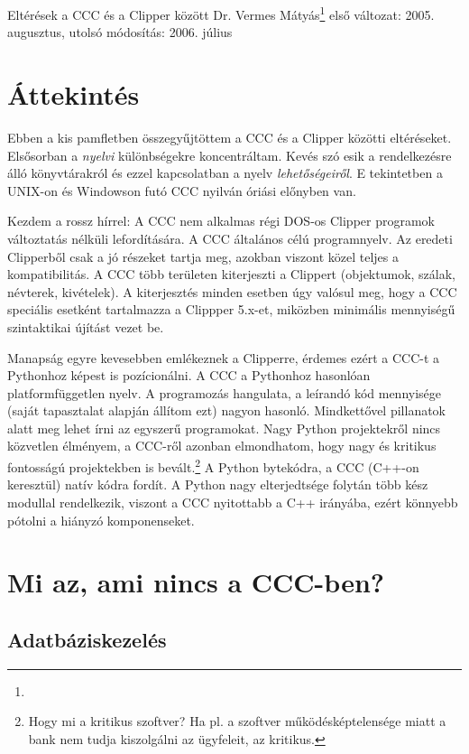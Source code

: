 
\pagetitle%
{Eltérések a CCC és a Clipper  között}%
{Dr. Vermes Mátyás\footnote{\ComFirm}}%
{első változat: 2005. augusztus, utolsó módosítás: 2006. július}

\section{Áttekintés}

Ebben a kis pamfletben összegyűjtöttem a CCC és a Clipper közötti 
eltéréseket. Elsősorban a {\em nyelvi\/} különbségekre koncentráltam. 
Kevés szó esik a rendelkezésre álló könyvtárakról és ezzel kapcsolatban 
a nyelv {\em lehetőségeiről}. E tekintetben a UNIX-on és Windowson 
futó CCC nyilván óriási előnyben van.

Kezdem a rossz hírrel: A CCC nem alkalmas  
régi DOS-os Clipper programok változtatás nélküli lefordítására. 
A CCC  általános célú programnyelv. Az eredeti Clipperből
csak a jó részeket tartja meg, azokban viszont közel teljes 
a kompatibilitás. 
A CCC több területen kiterjeszti a Clippert 
(objektumok, szálak, névterek, kivételek). A kiterjesztés minden esetben
úgy valósul meg, hogy a CCC speciális esetként tartalmazza
a Clippper 5.x-et, miközben minimális mennyiségű szintaktikai 
újítást vezet be. 

Manapság egyre kevesebben emlékeznek a Clipperre,
érdemes ezért a CCC-t a Pythonhoz képest is pozícionálni.
A CCC a Pythonhoz hasonlóan platformfüggetlen  nyelv.
A programozás hangulata, a leírandó kód mennyisége
(saját tapasztalat alapján állítom ezt) nagyon hasonló. 
Mindkettővel pillanatok alatt meg lehet írni az egyszerű
programokat. Nagy Python projektekről nincs közvetlen élményem,
a CCC-ről azonban elmondhatom, hogy nagy és kritikus fontosságú
projektekben is bevált.\footnote{Hogy mi a kritikus szoftver?
Ha pl. a szoftver  működésképtelensége miatt a bank 
nem tudja kiszolgálni az ügyfeleit, az kritikus.}
A Python bytekódra, a CCC (C++-on keresztül) natív kódra fordít. 
A Python nagy elterjedtsége folytán több kész modullal rendelkezik, 
viszont a CCC nyitottabb a C++ irányába, ezért könnyebb 
pótolni a hiányzó komponenseket. 


\section{Mi az, ami nincs a CCC-ben?}

\subsection{Adatbáziskezelés}

